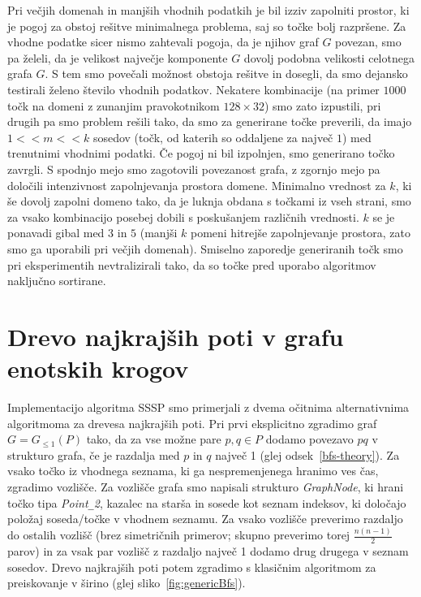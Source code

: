 \documentclass[a4paper, 12pt]{book}
\newcommand{\GG}{\ensuremath{G_{\le 1}}}
\newcommand{\U}{\texttt{\_}}
\begin{document}
Pri večjih domenah in manjših vhodnih podatkih je bil izziv zapolniti prostor, ki je pogoj za obstoj rešitve minimalnega problema, saj so točke bolj razpršene. Za vhodne podatke sicer nismo zahtevali pogoja, da je njihov graf $G$ povezan, smo pa želeli, da je velikost največje komponente $G$ dovolj podobna velikosti celotnega grafa $G$. S tem smo povečali možnost obstoja rešitve in dosegli, da smo dejansko testirali želeno število vhodnih podatkov. Nekatere kombinacije (na primer $1000$ točk na domeni z zunanjim pravokotnikom $128\times 32$) smo zato izpustili, pri drugih pa smo problem rešili tako, da smo za generirane točke preverili, da imajo $1 << m << k$ sosedov (točk, od katerih so oddaljene za največ $1$) med trenutnimi vhodnimi podatki. Če pogoj ni bil izpolnjen, smo generirano točko zavrgli. S spodnjo mejo smo zagotovili povezanost grafa, z zgornjo mejo pa določili intenzivnost zapolnjevanja prostora domene. Minimalno vrednost za $k$, ki še dovolj zapolni domeno tako, da je luknja obdana s točkami iz vseh strani, smo za vsako kombinacijo posebej dobili s poskušanjem različnih vrednosti. $k$ se je ponavadi gibal med $3$ in $5$ (manjši $k$ pomeni hitrejše zapolnjevanje prostora, zato smo ga uporabili pri večjih domenah). Smiselno zaporedje generiranih točk smo pri eksperimentih nevtralizirali tako, da so točke pred uporabo algoritmov naključno sortirane.

\section{Drevo najkrajših poti v grafu enotskih krogov}
Implementacijo algoritma SSSP smo primerjali z dvema očitnima alternativnima algoritmoma za drevesa najkrajših poti. Pri prvi eksplicitno zgradimo graf $G=\GG(P)$ tako, da za vse možne pare $p, q\in P$ dodamo povezavo $pq$ v strukturo grafa, če je razdalja med $p$ in $q$ največ 1 (glej odsek~\ref{bfs-theory}). Za vsako točko iz vhodnega seznama, ki ga nespremenjenega hranimo ves čas, zgradimo vozlišče. Za vozlišče grafa smo napisali strukturo \textit{GraphNode}, ki hrani točko tipa \textit{Point\U 2}, kazalec na starša in sosede kot seznam indeksov, ki določajo položaj soseda/točke v vhodnem seznamu. Za vsako vozlišče preverimo razdaljo do ostalih vozlišč (brez simetričnih primerov; skupno preverimo torej $\frac{n(n-1)}{2}$ parov) in za vsak par vozlišč z razdaljo največ 1 dodamo drug drugega v seznam sosedov. Drevo najkrajših poti potem zgradimo s klasičnim algoritmom za preiskovanje v širino (glej sliko~\ref{fig:genericBfs}). 
\end{document}
